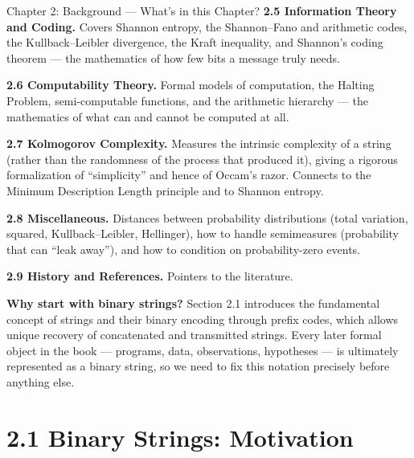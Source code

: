 \documentclass[aspectratio=169,10pt]{beamer}
\begin{document}
\begin{frame}[allowframebreaks]{Chapter 2: Background --- What's in this Chapter?}
\textbf{2.5 Information Theory and Coding.} Covers Shannon entropy, the
Shannon--Fano and arithmetic codes, the Kullback--Leibler divergence, the
Kraft inequality, and Shannon's coding theorem --- the mathematics of how
few bits a message truly needs.

\textbf{2.6 Computability Theory.} Formal models of computation, the
Halting Problem, semi-computable functions, and the arithmetic hierarchy
--- the mathematics of what can and cannot be computed at all.

\framebreak

\textbf{2.7 Kolmogorov Complexity.} Measures the intrinsic complexity of a
string (rather than the randomness of the process that produced it),
giving a rigorous formalization of ``simplicity'' and hence of Occam's
razor. Connects to the Minimum Description Length principle and to
Shannon entropy.

\textbf{2.8 Miscellaneous.} Distances between probability distributions
(total variation, squared, Kullback--Leibler, Hellinger), how to handle
semimeasures (probability that can ``leak away''), and how to condition on
probability-zero events.

\textbf{2.9 History and References.} Pointers to the literature.

\framebreak

\textbf{Why start with binary strings?} Section 2.1 introduces the
fundamental concept of strings and their binary encoding through prefix
codes, which allows unique recovery of concatenated and transmitted
strings. Every later formal object in the book --- programs, data,
observations, hypotheses --- is ultimately represented as a binary string,
so we need to fix this notation precisely before anything else.

\end{frame}

\section{2.1 Binary Strings: Motivation}
\end{document}
